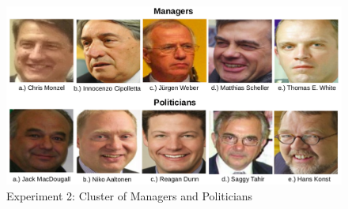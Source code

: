 \documentclass[12pt,english]{article}
\begin{document}
\begin{figure}[H]
 \centering
    \includegraphics[width=\columnwidth]{figures/manager.png}
    \caption{Experiment 2: Cluster of Managers and Politicians}
    \label{fig:ex2tp}
\end{figure}
\end{document}
